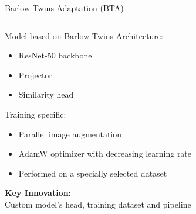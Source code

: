 \documentclass{beamer}
\begin{document}
\begin{frame}{Barlow Twins Adaptation (BTA)}
\begin{columns}
    \begin{block}{Model based on Barlow Twins}
        \vspace{3mm}
        Architecture:
        \begin{itemize}
            \item ResNet-50 backbone
            \item Projector
            \item Similarity head
        \end{itemize}
        Training specific:
        \begin{itemize}
            \item Parallel image augmentation
            \item AdamW optimizer with decreasing learning rate
            \item Performed on a specially selected dataset
        \end{itemize}
        
        \vspace{2mm}
        \textbf{Key Innovation:} \\
        Custom model's head, training dataset and pipeline \\
    \end{block}
    

\end{columns}
\end{frame}
\end{document}
